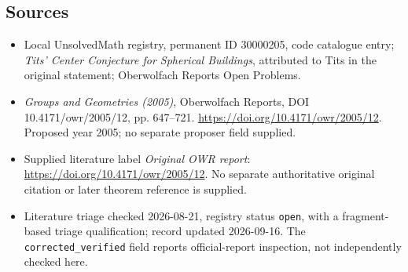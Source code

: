 \documentclass[11pt]{article}
\begin{document}
\subsection{Sources}
\begin{itemize}\item Local UnsolvedMath registry, permanent ID 30000205, code catalogue entry; \emph{Tits' Center Conjecture for Spherical Buildings}, attributed to Tits in the original statement; Oberwolfach Reports Open Problems.\item \emph{Groups and Geometries (2005)}, Oberwolfach Reports, DOI 10.4171/owr/2005/12, pp. 647--721. \url{https://doi.org/10.4171/owr/2005/12}. Proposed year 2005; no separate proposer field supplied.\item Supplied literature label \emph{Original OWR report}: \url{https://doi.org/10.4171/owr/2005/12}. No separate authoritative original citation or later theorem reference is supplied.\item Literature triage checked 2026-08-21, registry status \texttt{open}, with a fragment-based triage qualification; record updated 2026-09-16. The \texttt{corrected\_verified} field reports official-report inspection, not independently checked here.\end{itemize}
\end{document}
